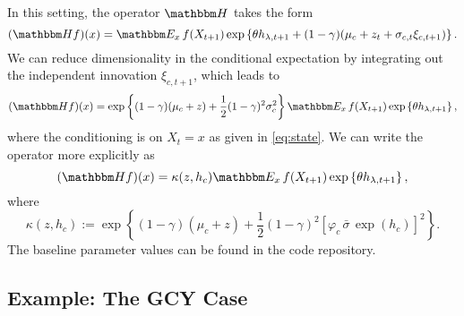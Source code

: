 \documentclass[12pt, reqno]{amsart}
\newcommand{\1}{\mathbbm 1}
\newcommand{\HH}{\mathbbm H}
\newcommand{\EE}{\mathbbm E}
\renewcommand{\phi}{\varphi}
\theoremstyle{plain}
\theoremstyle{definition}
\begin{document}
In this setting, the operator $\HH$ takes the form
%
\begin{equation*}
    (\HH f)(x)
    = \EE_x
        \, f(X_{t+1}) 
        \exp \left\{
            \theta h_{\lambda, t+1}
            + (1-\gamma)(\mu_c + z_t + \sigma_{c, t} \xi_{c, t+1})
        \right\}.
\end{equation*}
%
We can reduce dimensionality in the conditional expectation by integrating out
the independent innovation $\xi_{c, t+1}$, which leads to 
%
\begin{equation}
    (\HH f)(x)
    = \exp \left\{
            (1-\gamma)(\mu_c + z)
            + \frac{1}{2} (1-\gamma)^2 \sigma_c^2 
        \right\}
        \EE_x \, f(X_{t+1}) 
        \exp \left\{
            \theta h_{\lambda, t+1}
        \right\},
\end{equation}
%
where the conditioning is on $X_t = x$ as given in \eqref{eq:state}.
We can write the operator more explicitly as
%
\begin{equation}
    (\HH f)(x)
    = \kappa(z, h_c)
        \EE_x \, f(X_{t+1}) 
        \exp \left\{
            \theta h_{\lambda, t+1}
        \right\},
\end{equation}
%
where
%
\begin{equation}\label{eq:kap}
    \kappa(z, h_c) 
     := \exp \left\{
            (1-\gamma)(\mu_c + z)
            + \frac{1}{2} (1-\gamma)^2 
            [\phi_c \, \bar{\sigma} \, \exp(h_c)]^2 
        \right\}.
\end{equation}
%
The baseline parameter values can be found in the code repository.



\subsection{Example: The GCY Case}
\end{document}
